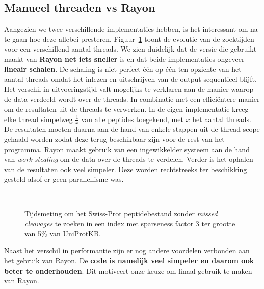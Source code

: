 \subsection{Manueel threaden vs Rayon}\label{subsec:manueel-threaden-vs-rayon}
Aangezien we twee verschillende implementaties hebben, is het interessant om na te gaan hoe deze allebei presteren.
Figuur~\ref{fig:threading_default_vs_rayon} toont de evolutie van de zoektijden voor een verschillend aantal threads.
We zien duidelijk dat de versie die gebruikt maakt van \textbf{Rayon net iets sneller} is en dat beide implementaties ongeveer \textbf{lineair schalen}.
De schaling is niet perfect één op één ten opzichte van het aantal threads omdat het inlezen en uitschrijven van de output sequentieel blijft.
Het verschil in uitvoeringstijd valt mogelijks te verklaren aan de manier waarop de data verdeeld wordt over de threads.
In combinatie met een efficiëntere manier om de resultaten uit de threads te verwerken.
In de eigen implementatie kreeg elke thread simpelweg $\frac{1}{x}$ van alle peptides toegekend, met $x$ het aantal threads.
De resultaten moeten daarna aan de hand van enkele stappen uit de thread-scope gehaald worden zodat deze terug beschikbaar zijn voor de rest van het programma.
Rayon maakt gebruik van een ingewikkelder systeem aan de hand van \textit{work stealing}\cite{rayon_stealing} om de data over de threads te verdelen.
Verder is het ophalen van de resultaten ook veel simpeler.
Deze worden rechtstreeks ter beschikking gesteld alsof er geen parallellisme was.

\begin{figure}[H]
    \centering
    \\[4ex] %

    \caption{Tijdsmeting om het Swiss-Prot peptidebestand zonder \textit{missed cleavages} te zoeken in een index met sparseness factor 3 ter grootte van 5\% van UniProtKB.}\label{fig:threading_default_vs_rayon}
\end{figure}

Naast het verschil in performantie zijn er nog andere voordelen verbonden aan het gebruik van Rayon.
De \textbf{code is namelijk veel simpeler en daarom ook beter te onderhouden}.
Dit motiveert onze keuze om finaal gebruik te maken van Rayon.

